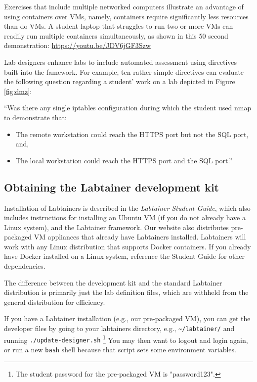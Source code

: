 \documentclass[12pt]{article}
\begin{document}
Exercises that include multiple networked computers illustrate an advantage 
of using containers over VMs, namely, containers require significantly less resources
than do VMs.  A student laptop that struggles to run two or more VMs can readily 
run multiple containers simultaneously, as shown in this 50 second demonstration: \url{https://youtu.be/JDV6jGF3Szw} 

Lab designers enhance labs to include automated assessment using directives built into the famework.
For example, ten rather simple directives can evaluate the following question regarding a student'
work on a lab depicted in Figure \ref{fig:dmz}:

``Was there any
single iptables configuration during which the student used nmap to demonstrate that:
\begin{itemize}
\item The remote workstation could reach the HTTPS port but not the SQL port, and,
\item The local workstation could reach the HTTPS port and the SQL port.''
\end{itemize}

\subsection {Obtaining the Labtainer development kit}
Installation of Labtainers is described in the \textit{Labtainer Student Guide},  
which also includes instructions for installing an Ubuntu VM (if you do not already have a Linux system),
and the Labtainer framework.  Our website also distributes pre-packaged VM appliances that already have
Labtainers installed. Labtainers will work with any Linux
distribution that supports Docker containers.  If you already have Docker installed on a Linux system, 
reference the Student Guide for other dependencies. 

The difference between the development kit and the standard Labtainer distribution is primarily
just the lab definition files, which are withheld from the general distribution for efficiency.


If you have a Labtainer installation (e.g., our pre-packaged VM), you can get the developer files by going to your
labtainers directory, e.g., {\tt \~{}/labtainer/} and running {\tt ./update-designer.sh}
\footnote{The student password for the pre-packaged VM is "password123".}
You may then want to logout and login again, or run a new {\tt bash} shell because that script
sets some environment variables.
\end{document}
